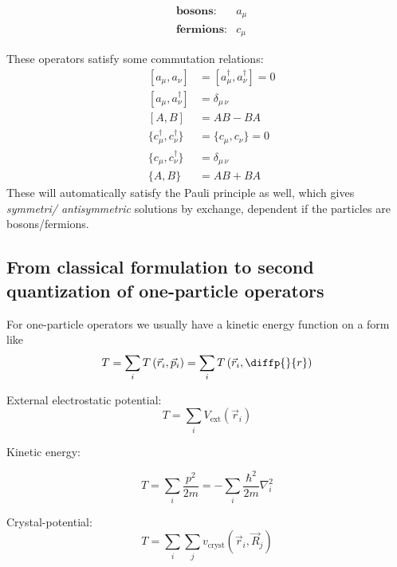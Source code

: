 \begin{align*}
&\textbf{bosons}: &a_\mu \\ 
&\textbf{fermions}: &c_\mu
\end{align*}


These operators satisfy some commutation relations:
\begin{align}
&[a_\mu, a_{\nu}] & = [a_\mu^\dagger, a_{\nu}^\dagger] = 0 \\
&[a_\mu, a_{\nu}^\dagger] & = \delta_{\mu\,\nu} \\
&[A,B] &= AB-BA \\
&\{c_\mu^\dagger, c_{\nu}^\dagger\} & = \{c_\mu, c_{\nu}\} = 0 \\
&\{c_\mu, c_{\nu}^\dagger\} & = \delta_{\mu\,\nu} \\
&\{A,B\} &= AB + BA
\end{align}
These will automatically satisfy the Pauli principle as well, which gives \emph{symmetri/ \emph{antisymmetric}} solutions by exchange, dependent if the particles are bosons/fermions. 


\subsection{From classical formulation to second quantization of one-particle operators}

For one-particle operators we usually have a kinetic energy function on a form like
\begin{equation}
T = \sum_i T\left(\vec{r}_i, \vec{p}_i\right) = \sum_i T\left(\vec{r}_i, \diffp{}{r}\right)
\end{equation}
\begin{theorem}
External electrostatic potential:
\begin{equation}
T = \sum_i V_{\text{ext}}\left(\vec{r}_i\right)
\end{equation}
\end{theorem}
\begin{theorem}

Kinetic energy:

\begin{equation}
T = \sum_i \frac{p^2}{2m} = -\sum_i \frac{\hbar^2}{2m}\nabla_i^2
\end{equation}
\end{theorem}

\begin{theorem}
Crystal-potential:
\begin{equation}
T = \sum_i \sum_j v_{\text{cryst}} \left( \vec{r}_i, \vec{R}_j \right)
\end{equation}
\end{theorem}


